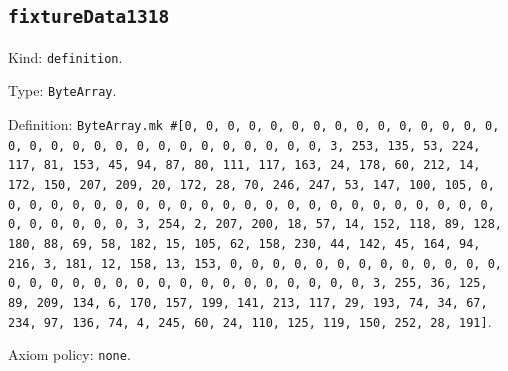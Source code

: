 \documentclass[11pt]{article}
\begin{document}
\subsection*{\texttt{fixtureData1318}}
\noindent Kind: \texttt{definition}.\par
\noindent Type: \texttt{ByteArray}.\par
\noindent Definition: \texttt{ByteArray.mk \#[0, 0, 0, 0, 0, 0, 0, 0, 0, 0, 0, 0, 0, 0, 0, 0, 0, 0, 0, 0, 0, 0, 0, 0, 0, 0, 0, 0, 0, 0, 3, 253, 135, 53, 224, 117, 81, 153, 45, 94, 87, 80, 111, 117, 163, 24, 178, 60, 212, 14, 172, 150, 207, 209, 20, 172, 28, 70, 246, 247, 53, 147, 100, 105, 0, 0, 0, 0, 0, 0, 0, 0, 0, 0, 0, 0, 0, 0, 0, 0, 0, 0, 0, 0, 0, 0, 0, 0, 0, 0, 0, 0, 0, 0, 3, 254, 2, 207, 200, 18, 57, 14, 152, 118, 89, 128, 180, 88, 69, 58, 182, 15, 105, 62, 158, 230, 44, 142, 45, 164, 94, 216, 3, 181, 12, 158, 13, 153, 0, 0, 0, 0, 0, 0, 0, 0, 0, 0, 0, 0, 0, 0, 0, 0, 0, 0, 0, 0, 0, 0, 0, 0, 0, 0, 0, 0, 0, 0, 3, 255, 36, 125, 89, 209, 134, 6, 170, 157, 199, 141, 213, 117, 29, 193, 74, 34, 67, 234, 97, 136, 74, 4, 245, 60, 24, 110, 125, 119, 150, 252, 28, 191]}.\par
\noindent Axiom policy: \texttt{none}.\par
\end{document}
